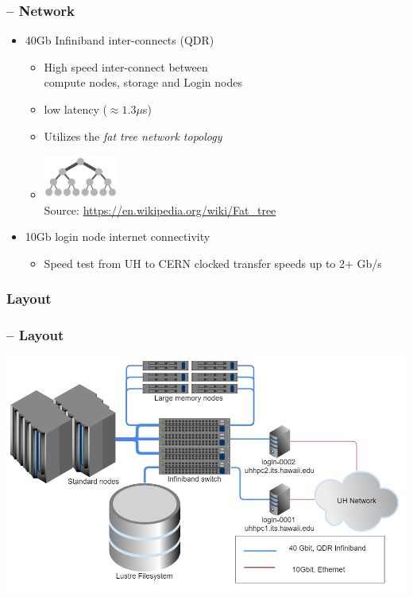 \begin{frame}
	\frametitle{{\craycs} -- Network}
	\begin{itemize}
		\item 40Gb Infiniband inter-connects (QDR)
		\begin{itemize}
			\item High speed inter-connect between~\\compute nodes, {\lustre} storage and Login nodes
                        \item low latency ($\approx1.3\mu$s)
			\item Utilizes the \emph{fat tree network topology}
			\item[] \includegraphics[width=0.20\textwidth]{images/Fat_tree_network} \\[-1ex] {\fontsize{3}{4} \selectfont Source: \url{https://en.wikipedia.org/wiki/Fat_tree} } 		
		\end{itemize}
		\item 10Gb login node internet connectivity
		\begin{itemize}
			\item Speed test from UH to CERN clocked transfer speeds up to 2$+$ Gb/s
		\end{itemize}	
	\end{itemize}
\end{frame}

\subsubsection{Layout}
\begin{frame}
	\frametitle{{\craycs} -- Layout}
	\includegraphics[width=1\textwidth]{images/layout}
\end{frame}

